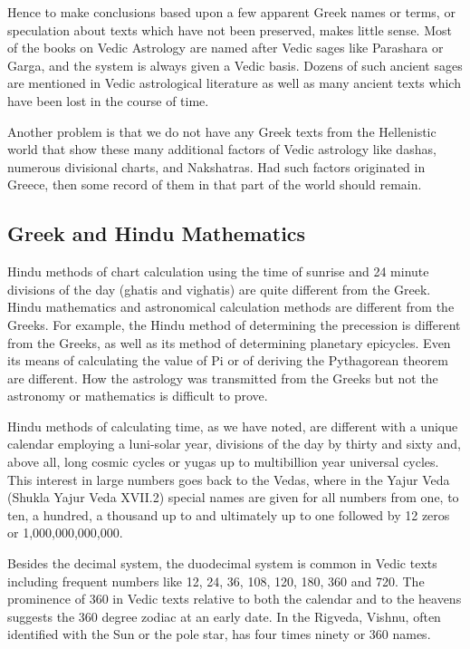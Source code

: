  

Hence to make conclusions based upon a few apparent Greek names or terms, or speculation about texts which have not been preserved, makes little sense. Most of the books on Vedic Astrology are named after Vedic sages like Parashara or Garga, and the system is always given a Vedic basis. Dozens of such ancient sages are mentioned in Vedic astrological literature as well as many ancient texts which have been lost in the course of time.

 

Another problem is that we do not have any Greek texts from the Hellenistic world that show these many additional factors of Vedic astrology like dashas, numerous divisional charts, and Nakshatras. Had such factors originated in Greece, then some record of them in that part of the world should remain.

 

\subsection{Greek and Hindu Mathematics}

 

Hindu methods of chart calculation using the time of sunrise and 24 minute divisions of the day (ghatis and vighatis) are quite different from the Greek. Hindu mathematics and astronomical calculation methods are different from the Greeks. For example, the Hindu method of determining the precession is different from the Greeks, as well as its method of determining planetary epicycles. Even its means of calculating the value of Pi or of deriving the Pythagorean theorem are different. How the astrology was transmitted from the Greeks but not the astronomy or mathematics is difficult to prove.

 

Hindu methods of calculating time, as we have noted, are different with a unique calendar employing a luni-solar year, divisions of the day by thirty and sixty and, above all, long cosmic cycles or yugas up to multibillion year universal cycles. This interest in large numbers goes back to the Vedas, where in the Yajur Veda (Shukla Yajur Veda XVII.2) special names are given for all numbers from one, to ten, a hundred, a thousand up to and ultimately up to one followed by 12 zeros or 1,000,000,000,000.

 

Besides the decimal system, the duodecimal system is common in Vedic texts including frequent numbers like 12, 24, 36, 108, 120, 180, 360 and 720. The prominence of 360 in Vedic texts relative to both the calendar and to the heavens suggests the 360 degree zodiac at an early date. In the Rigveda, Vishnu, often identified with the Sun or the pole star, has four times ninety or 360 names.

